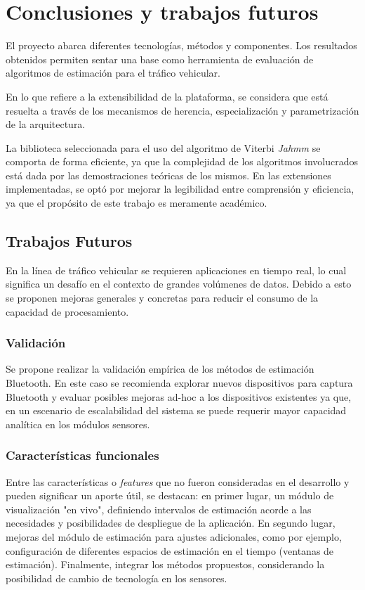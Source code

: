\let\textcircled=\pgftextcircled
\chapter {Conclusiones y trabajos futuros}
\label{chap:conclusiones}

El proyecto abarca diferentes tecnologías, métodos y componentes. Los resultados obtenidos permiten sentar una base como herramienta de evaluación de algoritmos de estimación para el tráfico vehicular.

En lo que refiere a la extensibilidad de la plataforma, se considera que está resuelta a través de los mecanismos de herencia, especialización y parametrización de la arquitectura.

La biblioteca seleccionada para el uso del algoritmo de Viterbi \textit{Jahmm} se comporta de forma eficiente, ya que la complejidad de los algoritmos involucrados está dada por las demostraciones teóricas de los mismos. En las extensiones implementadas, se optó por mejorar la legibilidad entre comprensión y eficiencia, ya que el propósito de este trabajo es meramente académico.

\section{Trabajos Futuros}

En la línea de tráfico vehicular se requieren aplicaciones en tiempo real, lo cual significa un desafío en el contexto de grandes volúmenes de datos. Debido a esto se proponen mejoras generales y concretas para reducir el consumo de la capacidad de procesamiento.

\subsection{Validación}

Se propone realizar la validación empírica de los métodos de estimación Bluetooth. En este caso se recomienda explorar nuevos dispositivos para captura Bluetooth y evaluar posibles mejoras ad-hoc a los dispositivos existentes ya que, en un escenario de escalabilidad del sistema se puede requerir mayor capacidad analítica en los módulos sensores.

\subsection{Características funcionales}
Entre las características o \textit{features} que no fueron consideradas en el desarrollo y pueden significar un aporte útil, se destacan: en primer lugar, un módulo de visualización "en vivo", definiendo intervalos de estimación acorde a las necesidades y posibilidades de despliegue de la aplicación. En segundo lugar, mejoras del módulo de estimación para ajustes adicionales, como por ejemplo, configuración de diferentes espacios de estimación en el tiempo (ventanas de estimación). Finalmente, integrar los métodos propuestos, considerando la posibilidad de cambio de tecnología en los sensores.

